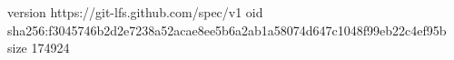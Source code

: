 version https://git-lfs.github.com/spec/v1
oid sha256:f3045746b2d2e7238a52acae8ee5b6a2ab1a58074d647c1048f99eb22c4ef95b
size 174924
